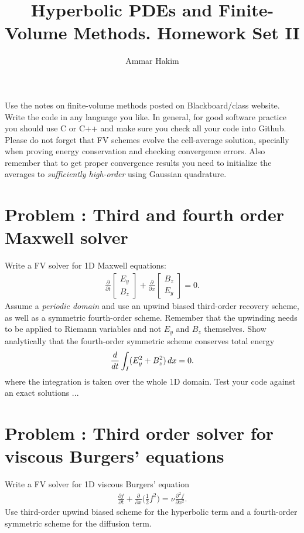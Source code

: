 \documentclass[11pt]{article}
\title{Hyperbolic PDEs and Finite-Volume Methods. Homework Set II}%
\author{Ammar Hakim}%
\date{}%
\newcommand{\pfrac}[2]{\frac{\partial #1}{\partial #2}}
\newcommand{\pfraca}[1]{\frac{\partial}{\partial #1}}
\newcounter{probnum}
\begin{document}
\maketitle

Use the notes on finite-volume methods posted on Blackboard/class
website. Write the code in any language you like. In general, for good
software practice you should use C or C++ and make sure you check all
your code into Github. Please do not forget that FV schemes evolve the
cell-average solution, specially when proving energy conservation and
checking convergence errors. Also remember that to get proper
convergence results you need to initialize the averages to
\emph{sufficiently high-order} using Gaussian quadrature.

\section*{Problem : Third and fourth order Maxwell solver}

Write a FV solver for 1D Maxwell equations:
\begin{align*}
  \frac{\partial }{\partial t}
  \left[
    \begin{matrix}
      E_y \\
      B_z
    \end{matrix}
  \right]
  +
  \frac{\partial }{\partial x}
  \left[
    \begin{matrix}
      B_z \\
      E_y
    \end{matrix}
  \right]
  =
  0.
\end{align*}
Assume a \emph{periodic domain} and use an upwind biased third-order
recovery scheme, as well as a symmetric fourth-order scheme. Remember
that the upwinding needs to be applied to Riemann variables and not
$E_y$ and $B_z$ themselves. Show analytically that the fourth-order
symmetric scheme conserves total energy
\begin{align}
  \frac{d}{dt} \int_I (E_y^2 + B_z^2) \thinspace dx = 0.
\end{align}
where the integration is taken over the whole 1D domain. Test your
code against an exact solutions ...

\section*{Problem : Third order solver for viscous
  Burgers' equations}

Write a FV solver for 1D viscous Burgers' equation
\begin{align}
  \pfrac{f}{t} + \pfraca{x} \bigg( \frac{1}{2} f^2 \bigg)
  = \nu \frac{\partial^2 f}{\partial x^2}.
\end{align}
Use third-order upwind biased scheme for the hyperbolic term and a
fourth-order symmetric scheme for the diffusion term.
\end{document}
